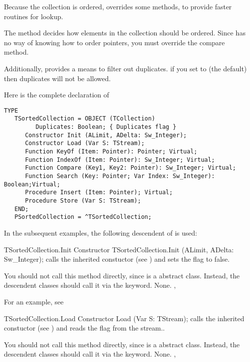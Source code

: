 Because the collection is ordered,  overrides some
 methods, to provide faster routines for lookup.

The  method decides how elements 
in the collection should be ordered. Since  has no way
of knowing how to order pointers, you must override the compare method.

Additionally,  provides a means to filter out duplicates.
if you set  to  (the default) then duplicates
will not be allowed.

Here is the complete declaration of 

\begin{verbatim}
TYPE
   TSortedCollection = OBJECT (TCollection)
         Duplicates: Boolean; { Duplicates flag }
      Constructor Init (ALimit, ADelta: Sw_Integer);
      Constructor Load (Var S: TStream);
      Function KeyOf (Item: Pointer): Pointer; Virtual;
      Function IndexOf (Item: Pointer): Sw_Integer; Virtual;
      Function Compare (Key1, Key2: Pointer): Sw_Integer; Virtual;
      Function Search (Key: Pointer; Var Index: Sw_Integer): Boolean;Virtual;
      Procedure Insert (Item: Pointer); Virtual;
      Procedure Store (Var S: TStream);
   END;
   PSortedCollection = ^TSortedCollection;
\end{verbatim}

In the subsequent examples, the following descendent of
 is used:



\begin{procedure}{TSortedCollection.Init}
\Declaration
Constructor TSortedCollection.Init (ALimit, ADelta: Sw\_Integer);
\Description
{} calls the inherited constuctor (see ) and
sets the  flag to false.

You should not call this method directly, since  is a
abstract class. Instead, the descendent classes should call it via the
 keyword.
\Errors
None.
\SeeAlso 
{}, 
\end{procedure}

For an example, see 

\begin{procedure}{TSortedCollection.Load}
\Declaration
Constructor Load (Var S: TStream);
\Description
{} calls the inherited constuctor (see ) and
reads the  flag from the stream..

You should not call this method directly, since  is a
abstract class. Instead, the descendent classes should call it via the
 keyword.
\Errors
None.
\SeeAlso 
{}, 
\end{procedure}

